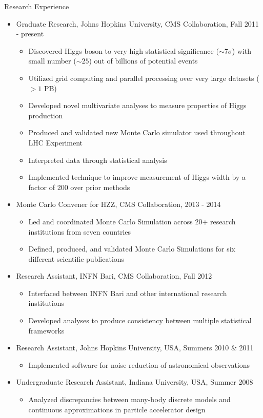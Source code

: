 \begin{small}

\begin{cvlist}{Research Experience}
\item
\begin{itemize}\itemsep=0.25em
	\item Graduate Research, Johns Hopkins University, CMS Collaboration, Fall 2011 - present
         \begin{itemize}
		\item Discovered Higgs boson to very high statistical significance ($\sim7\sigma$) with small number ($\sim 25$) out of billions of potential events
		\item Utilized grid computing and parallel processing over very large datasets ($> 1$ PB)
		\item Developed novel multivariate analyses to measure properties of Higgs production
		\item Produced and validated new Monte Carlo simulator used throughout LHC Experiment
		\item Interpreted data through statistical analysis
		\item Implemented technique to improve measurement of Higgs width by a factor of 200 over prior methods
	\end{itemize}
	\item Monte Carlo Convener for HZZ, CMS Collaboration, 2013 - 2014
	\begin{itemize}
		\item Led and coordinated Monte Carlo Simulation across 20+ research institutions from seven countries
		\item Defined, produced, and validated Monte Carlo Simulations for six different scientific publications
	\end{itemize}
	\item Research Assistant, INFN Bari, CMS Collaboration, Fall 2012
	\begin{itemize}
		\item Interfaced between INFN Bari and other international research institutions
		\item Developed analyses to produce consistency between multiple statistical frameworks
	\end{itemize}
	\item Research Assistant, Johns Hopkins University, USA, Summers 2010 \& 2011
	\begin{itemize}
		\item Implemented software for noise reduction of astronomical observations
	\end{itemize}
	\item Undergraduate Research Assistant, Indiana University, USA, Summer 2008
	\begin{itemize}
		\item Analyzed discrepancies between many-body discrete models and continuous approximations in particle accelerator design
	\end{itemize}
\end{itemize}
\end{cvlist}


\end{small}
